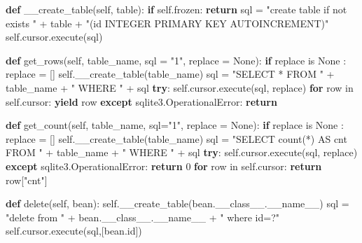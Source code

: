 \documentclass[]{article}
\newenvironment{Shaded}{}{}
\newcommand{\KeywordTok}[1]{\textcolor[rgb]{0.00,0.44,0.13}{\textbf{{#1}}}}
\newcommand{\DataTypeTok}[1]{\textcolor[rgb]{0.56,0.13,0.00}{{#1}}}
\newcommand{\DecValTok}[1]{\textcolor[rgb]{0.25,0.63,0.44}{{#1}}}
\newcommand{\StringTok}[1]{\textcolor[rgb]{0.25,0.44,0.63}{{#1}}}
\newcommand{\OtherTok}[1]{\textcolor[rgb]{0.00,0.44,0.13}{{#1}}}
\newcommand{\NormalTok}[1]{{#1}}
\begin{document}
\begin{Shaded}
\begin{Highlighting}[]
    \KeywordTok{def} \NormalTok{__create_table(}\OtherTok{self}\NormalTok{, table):}
        \KeywordTok{if} \OtherTok{self}\NormalTok{.frozen:}
            \KeywordTok{return}
        \NormalTok{sql = }\StringTok{"create table if not exists "} \NormalTok{+ table + }\StringTok{"(id INTEGER PRIMARY KEY AUTOINCREMENT)"}
        \OtherTok{self}\NormalTok{.cursor.execute(sql)}

    \KeywordTok{def} \NormalTok{get_rows(}\OtherTok{self}\NormalTok{, table_name, sql = }\StringTok{"1"}\NormalTok{, replace = }\OtherTok{None}\NormalTok{):}
        \KeywordTok{if} \NormalTok{replace is }\OtherTok{None} \NormalTok{: replace = []}
        \OtherTok{self}\NormalTok{.__create_table(table_name)}
        \NormalTok{sql = }\StringTok{"SELECT * FROM "} \NormalTok{+ table_name + }\StringTok{" WHERE "} \NormalTok{+ sql}
        \KeywordTok{try}\NormalTok{:}
            \OtherTok{self}\NormalTok{.cursor.execute(sql, replace)}
            \KeywordTok{for} \NormalTok{row in }\OtherTok{self}\NormalTok{.cursor:}
                \KeywordTok{yield} \NormalTok{row}
        \KeywordTok{except} \NormalTok{sqlite3.OperationalError:}
            \KeywordTok{return}
   
    \KeywordTok{def} \NormalTok{get_count(}\OtherTok{self}\NormalTok{, table_name, sql=}\StringTok{"1"}\NormalTok{, replace = }\OtherTok{None}\NormalTok{):}
        \KeywordTok{if} \NormalTok{replace is }\OtherTok{None} \NormalTok{: replace = []}
        \OtherTok{self}\NormalTok{.__create_table(table_name)}
        \NormalTok{sql = }\StringTok{"SELECT count(*) AS cnt FROM "} \NormalTok{+ table_name + }\StringTok{" WHERE "} \NormalTok{+ sql}
        \KeywordTok{try}\NormalTok{:}
            \OtherTok{self}\NormalTok{.cursor.execute(sql, replace)}
        \KeywordTok{except} \NormalTok{sqlite3.OperationalError:}
            \KeywordTok{return} \DecValTok{0}
        \KeywordTok{for} \NormalTok{row in }\OtherTok{self}\NormalTok{.cursor:}
            \KeywordTok{return} \NormalTok{row[}\StringTok{"cnt"}\NormalTok{]}

    \KeywordTok{def} \NormalTok{delete(}\OtherTok{self}\NormalTok{, bean):}
        \OtherTok{self}\NormalTok{.__create_table(bean.__class__.}\OtherTok{__name__}\NormalTok{)}
        \NormalTok{sql = }\StringTok{"delete from "} \NormalTok{+ bean.__class__.}\OtherTok{__name__} \NormalTok{+ }\StringTok{" where id=?"}
        \OtherTok{self}\NormalTok{.cursor.execute(sql,[bean.}\DataTypeTok{id}\NormalTok{])}
    

\end{Highlighting}
\end{Shaded}
\end{document}
